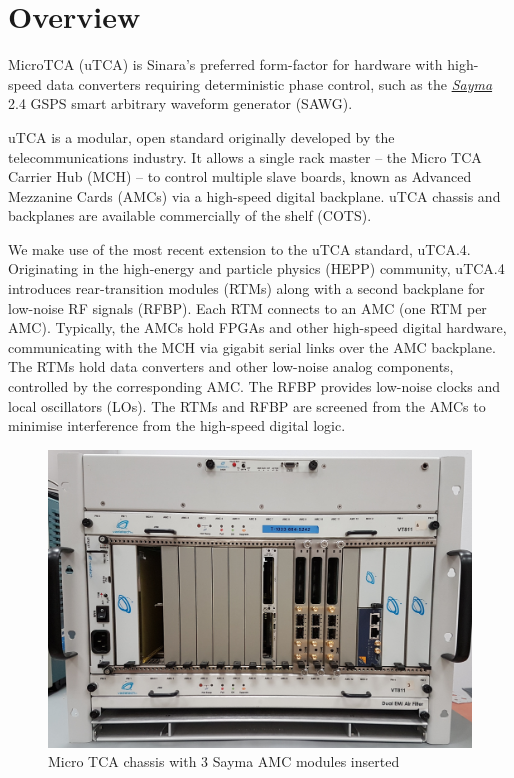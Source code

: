 \section{Overview}\label{overview}

MicroTCA (uTCA) is Sinara's preferred form-factor for hardware with
high-speed data converters requiring deterministic phase control, such
as the \href{Sayma}{\emph{Sayma}} 2.4 GSPS smart arbitrary waveform
generator (SAWG).

uTCA is a modular, open standard originally developed by the
telecommunications industry. It allows a single rack master -- the Micro
TCA Carrier Hub (MCH) -- to control multiple slave boards, known as
Advanced Mezzanine Cards (AMCs) via a high-speed digital backplane. uTCA
chassis and backplanes are available commercially of the shelf (COTS).

We make use of the most recent extension to the uTCA standard, uTCA.4.
Originating in the high-energy and particle physics (HEPP) community,
uTCA.4 introduces rear-transition modules (RTMs) along with a second
backplane for low-noise RF signals (RFBP). Each RTM connects to an AMC
(one RTM per AMC). Typically, the AMCs hold FPGAs and other high-speed
digital hardware, communicating with the MCH via gigabit serial links
over the AMC backplane. The RTMs hold data converters and other
low-noise analog components, controlled by the corresponding AMC. The
RFBP provides low-noise clocks and local oscillators (LOs). The RTMs and
RFBP are screened from the AMCs to minimise interference from the
high-speed digital logic.

\begin{figure}[htbp!]
\centering
\includegraphics[width=15cm]{img/MTCA_Front.jpg}
\caption{Micro TCA chassis with 3 Sayma AMC modules inserted}
\end{figure}

